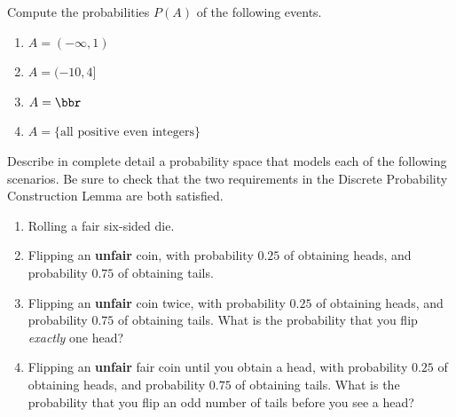 \documentclass[12pt,reqno]{amsart}
\begin{document}
Compute the probabilities $P(A)$ of the following events.

\medskip
\begin{enumerate}
    \item $A = (-\infty,1)$\vfill
    


    \item $A = (-10, 4]$\vfill
    


    \item $A = \bbr$\vfill
    

    
    \item $A = \{\text{all positive even integers}\}$\vfill
    

\end{enumerate}
















\newpage
\prob Describe in complete detail a probability space that models each of the following scenarios. Be sure to check that the two requirements in the Discrete Probability Construction Lemma are both satisfied.

\medskip
\begin{enumerate}
    \item Rolling a fair six-sided die.\vfill

    \item Flipping an \textbf{unfair} coin, with probability $0.25$ of obtaining heads, and probability $0.75$ of obtaining tails.\vfill
    
    

    \item Flipping an \textbf{unfair} coin twice, with probability $0.25$ of obtaining heads, and probability $0.75$ of obtaining tails. What is the probability that you flip \textit{exactly} one head?\vfill
    
    

    \item Flipping an \textbf{unfair} fair coin until you obtain a head, with probability $0.25$ of obtaining heads, and probability $0.75$ of obtaining tails. What is the probability that you flip an odd number of tails before you see a head?\vfill
    
    
\end{enumerate}
\end{document}
